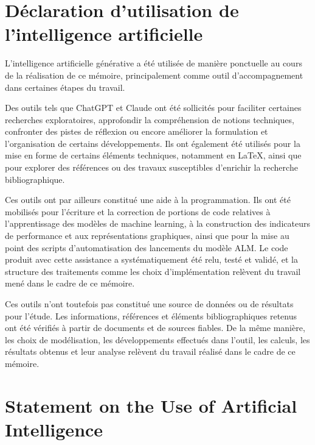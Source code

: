 \chapter*{Déclaration d'utilisation de l'intelligence artificielle}

L'intelligence artificielle générative a été utilisée de manière ponctuelle au cours de
la réalisation de ce mémoire, principalement comme outil d'accompagnement dans certaines
étapes du travail.

Des outils tels que ChatGPT et Claude ont été sollicités pour faciliter certaines recherches
exploratoires, approfondir la compréhension de notions techniques, confronter des pistes de
réflexion ou encore améliorer la formulation et l'organisation de certains développements.
Ils ont également été utilisés pour la mise en forme de certains éléments techniques,
notamment en \LaTeX{}, ainsi que pour explorer des références ou des travaux susceptibles
d'enrichir la recherche bibliographique.

Ces outils ont par ailleurs constitué une aide à la programmation. Ils ont été mobilisés
pour l'écriture et la correction de portions de code relatives à l'apprentissage des modèles
de machine learning, à la construction des indicateurs de performance et aux représentations
graphiques, ainsi que pour la mise au point des scripts d'automatisation des lancements du
modèle ALM. Le code produit avec cette assistance a systématiquement été relu, testé et
validé, et la structure des traitements comme les choix d'implémentation relèvent du travail
mené dans le cadre de ce mémoire.

Ces outils n'ont toutefois pas constitué une source de données ou de résultats pour l'étude.
Les informations, références et éléments bibliographiques retenus ont été vérifiés à partir
de documents et de sources fiables. De la même manière, les choix de modélisation, les
développements effectués dans l'outil, les calculs, les résultats obtenus et leur analyse
relèvent du travail réalisé dans le cadre de ce mémoire.

\vspace{1.5cm}

\chapter*{Statement on the Use of Artificial Intelligence}

